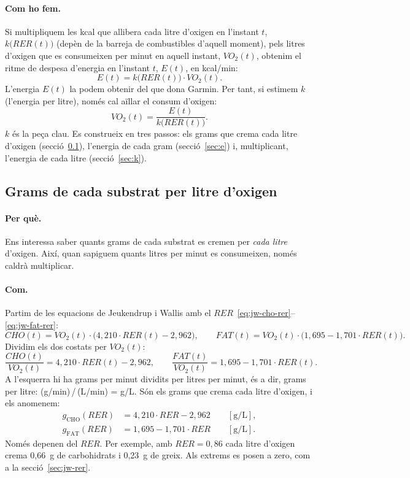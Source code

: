 \documentclass[10pt,a4paper]{article}
\newcommand{\sub}[1]{{\scriptscriptstyle\mathrm{#1}}}   %
\newcommand{\CHO}{\sub{CHO}}
\newcommand{\FAT}{\sub{FAT}}
\newcommand{\cho}{\ensuremath{\mathit{CHO}}}               %
\newcommand{\fat}{\ensuremath{\mathit{FAT}}}
\newcommand{\VO}{\ensuremath{\mathit{VO}_2}}               %
\newcommand{\RER}{\ensuremath{\mathit{RER}}}
\begin{document}
\paragraph{Com ho fem.} Si multipliquem les kcal que allibera cada litre d'oxigen en
l'instant $t$, $k\bigl(\RER(t)\bigr)$ (depèn de la barreja de combustibles d'aquell moment),
pels litres d'oxigen que es consumeixen per minut en aquell instant, $\VO(t)$, obtenim el
ritme de despesa d'energia en l'instant $t$, $E(t)$, en kcal/min:
\begin{equation}
  E(t)=k\bigl(\RER(t)\bigr)\cdot\VO(t) .
  \label{eq:energia-k}
\end{equation}
L'energia $E(t)$ la podem obtenir del que dona Garmin. Per tant, si estimem $k$ (l'energia per litre), només
cal aïllar el consum d'oxigen:
\begin{equation}
  \VO(t)=\frac{E(t)}{k\bigl(\RER(t)\bigr)} .
  \label{eq:vo2}
\end{equation}
$k$ és la peça clau. Es construeix en tres passos: els grams que crema
cada litre d'oxigen (secció~\ref{sec:g}), l'energia de cada gram (secció~\ref{sec:e}) i,
multiplicant, l'energia de cada litre (secció~\ref{sec:k}).

\subsection{Grams de cada substrat per litre d'oxigen}\label{sec:g}
\paragraph{Per què.} Ens interessa saber quants grams de cada substrat es cremen per
\emph{cada litre} d'oxigen. Així, quan sapiguem quants litres per minut es consumeixen,
només caldrà multiplicar.

\paragraph{Com.} Partim de les equacions de Jeukendrup i Wallis amb el
\RER~\eqref{eq:jw-cho-rer}--\eqref{eq:jw-fat-rer}:
\[
  \cho(t)=\VO(t)\cdot\bigl(4{,}210\cdot\RER(t)-2{,}962\bigr),\qquad
  \fat(t)=\VO(t)\cdot\bigl(1{,}695-1{,}701\cdot\RER(t)\bigr).
\]
Dividim els dos costats per $\VO(t)$:
\[
  \frac{\cho(t)}{\VO(t)}=4{,}210\cdot\RER(t)-2{,}962,\qquad
  \frac{\fat(t)}{\VO(t)}=1{,}695-1{,}701\cdot\RER(t) .
\]
A l'esquerra hi ha grams per minut dividits per litres per minut, és a dir, grams per
litre: (g/min)\,/\,(L/min) = g/L. Són els grams que crema cada
litre d'oxigen, i els anomenem:
\begin{align}
  g_{\CHO}(\RER) &= 4{,}210\cdot\RER-2{,}962 \qquad[\mathrm{g/L}], \label{eq:gc}\\
  g_{\FAT}(\RER) &= 1{,}695-1{,}701\cdot\RER \qquad[\mathrm{g/L}]. \label{eq:gf}
\end{align}
Només depenen del \RER. Per exemple, amb $\RER=0{,}86$ cada litre d'oxigen crema 0,66~g
de carbohidrats i 0,23~g de greix. Als extrems es posen a zero, com a la
secció~\ref{sec:jw-rer}.
\end{document}
